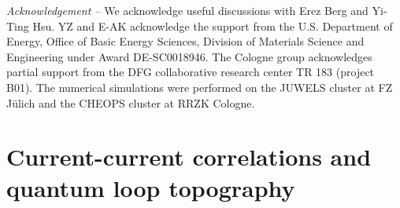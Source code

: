 \documentclass[amsmath,amssymb, aps, prx, longbibliography, twocolumn]{revtex4-1}
\begin{document}
{\it Acknowledgement --} 
We acknowledge useful discussions with Erez Berg and Yi-Ting Hsu. YZ and E-AK acknowledge the support from the U.S. Department of Energy, Office of Basic Energy Sciences, Division of Materials Science and Engineering under Award DE-SC0018946.
The Cologne group acknowledges partial support from the DFG collaborative research center TR 183 (project B01). 
The numerical simulations were performed on the JUWELS cluster at FZ J\"ulich and the CHEOPS cluster at RRZK Cologne.


%

\appendix

\section{Current-current correlations and quantum loop topography}
\end{document}
